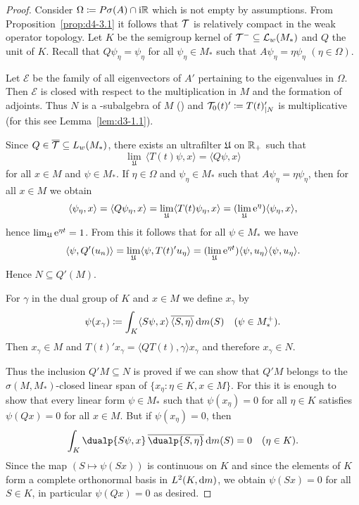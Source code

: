 \begin{proof}
Consider $\Omega \coloneqq P\sigma(A) \cap \mathrm{i}  \mathbb{R}$ which is not empty by assumptions.
From Proposition~\ref{prop:d4-3.1} it follows that $\mathcal{T}$ is relatively compact in the weak operator topology.
Let $K$ be the semigroup kernel of\/ $\mathcal{T}^{-} \subseteq \mathcal{L}_{w}{(M_{*})}$ and $Q$ the unit of\/ $K$.
Recall that $Q\psi_{\eta} = \psi_{\eta}$ for all $\psi_{\eta} \in M_{*}$ such that $A\psi_{\eta} = \eta\psi_{\eta}$ $(\eta \in \Omega)$.

Let $\mathcal{E}$ be the family of all eigenvectors of\/ $A'$ pertaining to the eigenvalues in $\Omega$.
Then $\mathcal{E}$ is closed with respect to the multiplication in $M$ and the formation of adjoints.
Thus $N$ is a \WA-subalgebra of\/ $M$ (\textcite[Corollary 1.7.9.]{sakai:1971}) and $\mathcal{T}_{0}(t)' \coloneqq T(t)'_{|N}$ is multiplicative (for this see Lemma~\ref{lem:d3-1.1}).

Since $Q \in \overline{\mathcal{T}}  \subseteq L_{w}(M_{*})$, there exists an ultrafilter $\mathfrak{U}$ on $\mathbb{R}_{+}$ such that 
%
\[
	\lim_{\mathfrak{U}} \, \langle T(t)\psi,x\rangle = \langle Q\psi,x\rangle
\]
%
for all $x \in M$ and $\psi \in M_{*}$.
If\/ $\eta \in \Omega$ and $\psi_{\eta} \in M_{*}$ such that $A\psi_{\eta} = \eta\psi_{\eta}$, then for all $x \in M$ we obtain
\[
\langle \psi_{\eta} ,x \rangle = \langle Q\psi_{\eta},x \rangle = \lim_{\mathfrak{U}} \langle T(t)\psi_{\eta},x \rangle = 
(\lim_{\mathfrak{U}} \mathrm{e}^{\eta}) \langle \psi_{\eta}, x \rangle,
\]
hence $\lim_{\mathfrak{U}} \mathrm{e}^{\eta t} = 1$.
From this it follows that for all $\psi \in M_{*}$ we have
\[
\langle\psi,Q'(u_{n})\rangle = \lim_{\mathfrak{U}} \langle\psi,T(t)'u_{\eta}\rangle 
= (\lim_{\mathfrak{U}} \mathrm{e}^{\eta t})\langle\psi,u_{\eta}\rangle 
 \langle\psi,u_{\eta}\rangle.
\]
Hence $N \subseteq Q'(M)$.

For $\gamma$ in the dual group of\/ $K$ and $x \in M$ we define $x_{\gamma}$ by
\[
\psi(x_{\gamma}) \coloneqq \int_{K} 
	\langle S\psi ,x \rangle \, \overline{\langle S,\eta \rangle}  \mathop{}\!\mathrm{d}{m}(S) \quad (\psi \in M_{*}^{+}).
\]
Then $x_{\gamma} \in M$ and $T(t)'x_{\gamma} = \langle QT(t),\gamma\rangle x_{\gamma}$ and therefore $x_{\gamma} \in N$.

Thus the inclusion $Q'M \subseteq N$ is proved if we can show that $Q'M$ belongs to the $\sigma(M,M_{*})$-closed linear span of\/ $\{x_{\eta} \colon \eta \in K, x \in M\}$.
For this it is enough to show that every linear form $\psi \in M_{*}$ such that $\psi(x_{\eta}) = 0$ for all $\eta \in K$ satisfies $\psi(Qx) = 0$ for all $x \in M$.
But if\/ $\psi(x_{\eta}) = 0$, then
\[
\int_{K} \dualp{S\psi,x} \, \overline{ \dualp{S,\eta} } \dm (S) = 0 \quad (\eta \in K) .
\]
Since the map $(S \mapsto \psi(Sx))$ is continuous on $K$ and since the elements of\/ $K$ form a complete orthonormal basis in $L^2(K,\mathop{}\!\mathrm{d}{m})$, we obtain $\psi(Sx) = 0$ for all $S \in K$, in particular $\psi(Qx) = 0$ as desired.


\end{proof}
